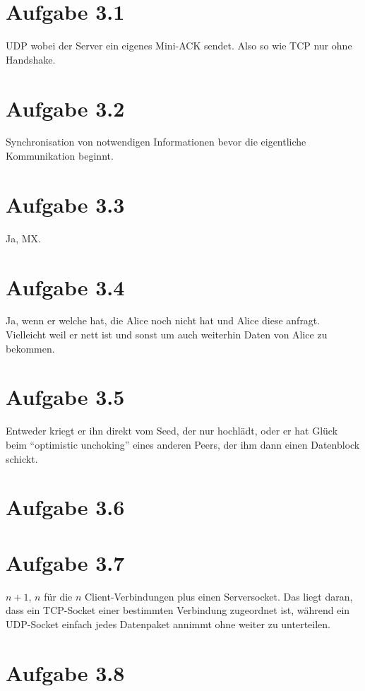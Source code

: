 \documentclass[10pt,a4paper]{article}
\begin{document}
\section{Aufgabe 3.1}

UDP wobei der Server ein eigenes Mini-ACK sendet. Also so wie TCP nur ohne
Handshake.

\section{Aufgabe 3.2}

Synchronisation von notwendigen Informationen bevor die eigentliche
Kommunikation beginnt.

\section{Aufgabe 3.3}

Ja, MX.

\section{Aufgabe 3.4}

Ja, wenn er welche hat, die Alice noch nicht hat und Alice diese
anfragt. Vielleicht weil er nett ist und sonst um auch weiterhin Daten von Alice
zu bekommen.

\section{Aufgabe 3.5}

Entweder kriegt er ihn direkt vom Seed, der nur hochlädt, oder er hat Glück beim
``optimistic unchoking'' eines anderen Peers, der ihm dann einen Datenblock
schickt.

\section{Aufgabe 3.6}

\section{Aufgabe 3.7}

$n + 1$, $n$ für die $n$ Client-Verbindungen plus einen Serversocket. Das liegt
daran, dass ein TCP-Socket einer bestimmten Verbindung zugeordnet ist, während
ein UDP-Socket einfach jedes Datenpaket annimmt ohne weiter zu unterteilen.

\section{Aufgabe 3.8}
\end{document}
